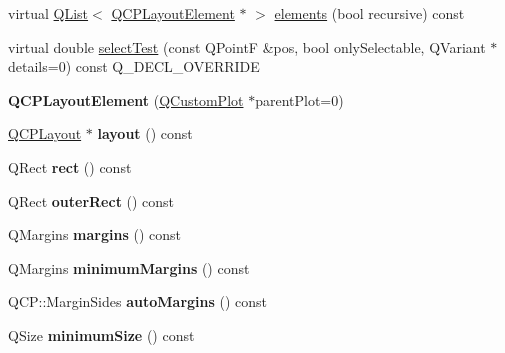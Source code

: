 \begin{DoxyCompactItemize}
\item 
virtual \hyperlink{class_q_list}{Q\+List}$<$ \hyperlink{class_q_c_p_layout_element}{Q\+C\+P\+Layout\+Element} $\ast$ $>$ \hyperlink{class_q_c_p_layout_element_a76dec8cb31e498994a944d7647a43309}{elements} (bool recursive) const
\item 
virtual double \hyperlink{class_q_c_p_layout_element_ae97f483cccedadbf18ea4525ef240ee4}{select\+Test} (const Q\+PointF \&pos, bool only\+Selectable, Q\+Variant $\ast$details=0) const Q\+\_\+\+D\+E\+C\+L\+\_\+\+O\+V\+E\+R\+R\+I\+DE
\item 
\mbox{\label{class_q_c_p_layout_element_a8947f0ada17e672aaba3d424cbbb67e3}} 
{\bfseries Q\+C\+P\+Layout\+Element} (\hyperlink{class_q_custom_plot}{Q\+Custom\+Plot} $\ast$parent\+Plot=0)
\item 
\mbox{\label{class_q_c_p_layout_element_ae2bbd5c774d151f41df9c61f64cd3ab0}} 
\hyperlink{class_q_c_p_layout}{Q\+C\+P\+Layout} $\ast$ {\bfseries layout} () const
\item 
\mbox{\label{class_q_c_p_layout_element_a208effccfe2cca4a0eaf9393e60f2dd4}} 
Q\+Rect {\bfseries rect} () const
\item 
\mbox{\label{class_q_c_p_layout_element_a2a32a12a6161c9dffbadeb9cc585510c}} 
Q\+Rect {\bfseries outer\+Rect} () const
\item 
\mbox{\label{class_q_c_p_layout_element_af4ac9450aa2d60863bf3a8ea0c940c9d}} 
Q\+Margins {\bfseries margins} () const
\item 
\mbox{\label{class_q_c_p_layout_element_a5eae30e28f28d73fd1c56409c011393e}} 
Q\+Margins {\bfseries minimum\+Margins} () const
\item 
\mbox{\label{class_q_c_p_layout_element_a2585bc8c5cc70ee712909751a2fc8909}} 
Q\+C\+P\+::\+Margin\+Sides {\bfseries auto\+Margins} () const
\item 
\mbox{\label{class_q_c_p_layout_element_a60d4295468a2b57fe91f6f68e20c3993}} 
Q\+Size {\bfseries minimum\+Size} () const
\item 

\end{DoxyCompactItemize}
